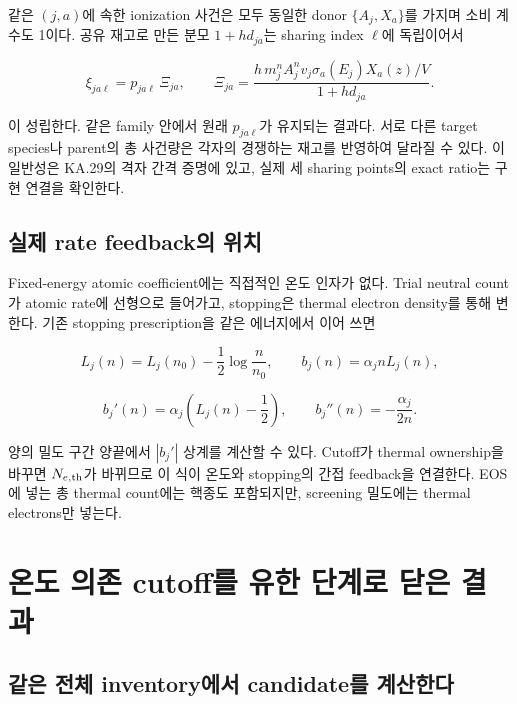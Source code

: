 \documentclass[11pt,a4paper]{article}
\begin{document}
같은 \((j,a)\)에 속한 ionization 사건은 모두 동일한 donor \(\{A_j,X_a\}\)를 가지며 소비 계수도 1이다. 공유 재고로 만든 분모 \(1+h d_{ja}\)는 sharing index \(\ell\)에 독립이어서

\[
\boxed{\xi_{ja\ell}=p_{ja\ell}\,\Xi_{ja},\qquad
\Xi_{ja}=\frac{h\,m_j^nA_j^nv_j\sigma_a(E_j)X_a(z)/V}{1+h d_{ja}}.}
\]

이 성립한다. 같은 family 안에서 원래 \(p_{ja\ell}\)가 유지되는 결과다. 서로 다른 target species나 parent의 총 사건량은 각자의 경쟁하는 재고를 반영하여 달라질 수 있다. 이 일반성은 KA.29의 격자 간격 증명에 있고, 실제 세 sharing points의 exact ratio는 구현 연결을 확인한다.

\hypertarget{uxc2e4uxc81c-rate-feedbackuxc758-uxc704uxce58}{%
\subsection{실제 rate feedback의 위치}\label{uxc2e4uxc81c-rate-feedbackuxc758-uxc704uxce58}}

Fixed-energy atomic coefficient에는 직접적인 온도 인자가 없다. Trial neutral count가 atomic rate에 선형으로 들어가고, stopping은 thermal electron density를 통해 변한다. 기존 stopping prescription을 같은 에너지에서 이어 쓰면

\[
L_j(n)=L_j(n_0)-\frac12\log\frac n{n_0},\qquad b_j(n)=\alpha_jnL_j(n),
\]

\[
b_j'(n)=\alpha_j\left(L_j(n)-\frac12\right),\qquad
b_j''(n)=-\frac{\alpha_j}{2n}.
\]

양의 밀도 구간 양끝에서 \(|b_j'|\) 상계를 계산할 수 있다. Cutoff가 thermal ownership을 바꾸면 \(N_{e,\rm th}\)가 바뀌므로 이 식이 온도와 stopping의 간접 feedback을 연결한다. EOS에 넣는 총 thermal count에는 핵종도 포함되지만, screening 밀도에는 thermal electrons만 넣는다.

\hypertarget{uxc628uxb3c4-uxc758uxc874-cutoffuxb97c-uxc720uxd55c-uxb2e8uxacc4uxb85c-uxb2ebuxc740-uxacb0uxacfc}{%
\section{온도 의존 cutoff를 유한 단계로 닫은 결과}\label{uxc628uxb3c4-uxc758uxc874-cutoffuxb97c-uxc720uxd55c-uxb2e8uxacc4uxb85c-uxb2ebuxc740-uxacb0uxacfc}}

\hypertarget{uxac19uxc740-uxc804uxccb4-inventoryuxc5d0uxc11c-candidateuxb97c-uxacc4uxc0b0uxd55cuxb2e4}{%
\subsection{같은 전체 inventory에서 candidate를 계산한다}\label{uxac19uxc740-uxc804uxccb4-inventoryuxc5d0uxc11c-candidateuxb97c-uxacc4uxc0b0uxd55cuxb2e4}}
\end{document}
